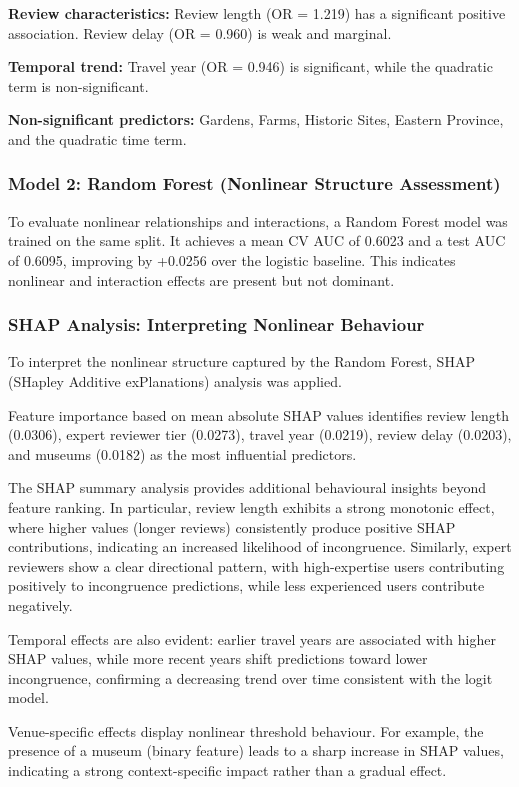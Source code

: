 \documentclass[conference]{IEEEtran}
\begin{document}
\textbf{Review characteristics:} Review length (OR = 1.219) has a significant positive association. Review delay (OR = 0.960) is weak and marginal.

\textbf{Temporal trend:} Travel year (OR = 0.946) is significant, while the quadratic term is non-significant.

\textbf{Non-significant predictors:} Gardens, Farms, Historic Sites, Eastern Province, and the quadratic time term.

\subsubsection{Model 2: Random Forest (Nonlinear Structure Assessment)}
To evaluate nonlinear relationships and interactions, a Random Forest model was trained on the same split. It achieves a mean CV AUC of 0.6023 and a test AUC of 0.6095, improving by +0.0256 over the logistic baseline. This indicates nonlinear and interaction effects are present but not dominant.

\subsubsection{SHAP Analysis: Interpreting Nonlinear Behaviour}
To interpret the nonlinear structure captured by the Random Forest, SHAP (SHapley Additive exPlanations) analysis was applied.

Feature importance based on mean absolute SHAP values identifies review length (0.0306), expert reviewer tier (0.0273), travel year (0.0219), review delay (0.0203), and museums (0.0182) as the most influential predictors.

The SHAP summary analysis provides additional behavioural insights beyond feature ranking. In particular, review length exhibits a strong monotonic effect, where higher values (longer reviews) consistently produce positive SHAP contributions, indicating an increased likelihood of incongruence. Similarly, expert reviewers show a clear directional pattern, with high-expertise users contributing positively to incongruence predictions, while less experienced users contribute negatively.

Temporal effects are also evident: earlier travel years are associated with higher SHAP values, while more recent years shift predictions toward lower incongruence, confirming a decreasing trend over time consistent with the logit model.

Venue-specific effects display nonlinear threshold behaviour. For example, the presence of a museum (binary feature) leads to a sharp increase in SHAP values, indicating a strong context-specific impact rather than a gradual effect.
\end{document}
